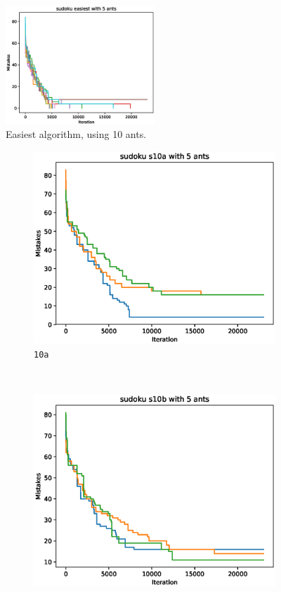 \documentclass[11pt]{article}
\begin{document}
\begin{figure}[H]
    \centering
    \includegraphics[width=0.5\textwidth]{images/sudoku_easiest_5.eps}
    \caption{Easiest algorithm, using 10 ants.}
    \label{fig:sudoku_easy_5}
\end{figure}

\begin{figure}[H]
    \centering
    \begin{subfigure}[t]{0.48\textwidth}
        \centering
        \includegraphics[width=\textwidth]{images/sudoku_10a_5.eps}
        \caption{\texttt{10a}}
        \label{fig:sudoku_10a}
    \end{subfigure}%
    ~
    \begin{subfigure}[t]{0.48\textwidth}
        \centering
        \includegraphics[width=\textwidth]{images/sudoku_10b_5.eps}

\end{subfigure}
\end{figure}
\end{document}
